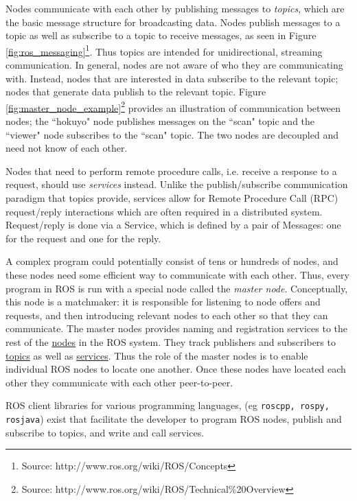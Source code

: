 Nodes communicate with each other by publishing messages
to \emph{topics}, which are the basic message structure for
broadcasting data. Nodes publish messages to a topic as well as subscribe
to a topic to receive messages, as seen in
Figure \ref{fig:ros_messaging}\footnote{Source: http://www.ros.org/wiki/ROS/Concepts}. 
Thus topics are intended for
unidirectional, streaming communication. In general, nodes are not
aware of who they are communicating with. Instead, nodes that are
interested in data subscribe to the relevant topic; nodes that
generate data publish to the relevant topic. Figure \ref{fig:master_node_example}\footnote{Source: http://www.ros.org/wiki/ROS/Technical\%20Overview} 
provides an illustration of communication between nodes; the ``hokuyo" node 
publishes messages on the ``scan" topic and the ``viewer" node subscribes to the
``scan" topic. The two nodes are decoupled and need not know of each other.
 
Nodes that need to perform remote procedure calls, i.e. receive a
response to a request, should use \emph{services} instead. Unlike the
publish/subscribe communication paradigm that topics provide, services
allow for Remote Procedure Call (RPC) request/reply interactions which
are often required in a distributed system. Request/reply is done via
a Service, which is defined by a pair of Messages: one for the request
and one for the reply.

A complex program could potentially consist of tens or hundreds of
nodes, and these nodes need some efficient way to communicate with
each other. Thus, every program in ROS is run with a special node
called the \emph{master node}. Conceptually, this node is a
matchmaker: it is responsible for listening to node offers and
requests, and then introducing relevant nodes to each other so that
they can communicate. The master nodes provides naming and
registration services to the rest of
the \href{http://www.ros.org/wiki/Nodes}{nodes} in the ROS system. They
track publishers and subscribers
to \href{http://www.ros.org/wiki/Topics}{topics} as well
as \href{http://www.ros.org/wiki/Services}{services}. Thus the role of
the master nodes is to enable individual ROS nodes to locate one
another. Once these nodes have located each other they communicate
with each other peer-to-peer.

ROS client libraries for various programming languages,
(eg \verb/roscpp, rospy, rosjava/) exist that facilitate the
developer to program ROS nodes, publish and subscribe to topics, and
write and call services.
 
